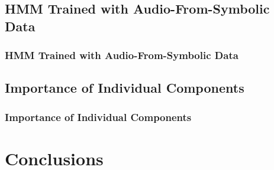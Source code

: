 \documentclass{beamer}
\begin{document}






\subsection[HMM Trained with Audio-From-Symbolic Data]{HMM Trained with Audio-From-Symbolic Data}

\begin{frame}
  \frametitle{HMM Trained with Audio-From-Symbolic Data}
  
\end{frame}  

\subsection[Importance of Individual Components]{Importance of Individual Components}

\begin{frame}
  \frametitle{Importance of Individual Components}
  
%
%  
%  

\end{frame}

\section[Conclusions]{Conclusions}
\end{document}
